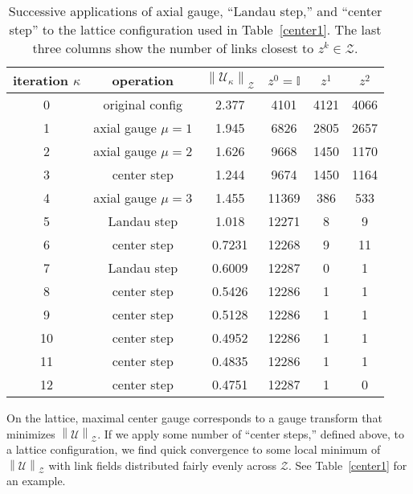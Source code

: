 \documentclass[preprint,aps,prd]{revtex4-2}
\newcommand{\zentrum}{\mathcal{Z}}       %
\newcommand{\config}{\mathcal{U}}
\begin{document}
\begin{table}
  \caption{Successive applications of axial gauge,
    ``Landau step,'' and ``center step'' to the lattice configuration
    used in Table~\ref{center1}.
    The last three columns show the number of links closest
    to $z^k \in \zentrum$.
    \label{center4}}
  \begin{tabular}{c|c|c|ccc}
    iteration $\kappa$ & operation & $\left\lVert \config_\kappa \right\rVert_\zentrum$
     & $z^0=\mathbb{I}$ & $z^1$ & $z^2$ \\
    \hline
    0 & original config    & 2.377  & 4101 & 4121 & 4066\\
    1 & axial gauge $\mu=1$& 1.945  & 6826 & 2805 & 2657\\
    2 & axial gauge $\mu=2$& 1.626  & 9668 & 1450 & 1170\\
    3 & center step        & 1.244  & 9674 & 1450 & 1164\\
    4 & axial gauge $\mu=3$& 1.455  & 11369 & 386 & 533\\
    5 & Landau step        & 1.018  & 12271 &   8 &   9\\
    6 & center step        & 0.7231 & 12268 &   9 &  11\\
    7 & Landau step        & 0.6009 & 12287 &   0 &   1\\
    8 & center step        & 0.5426 & 12286 &   1 &   1\\
    9 & center step        & 0.5128 & 12286 &   1 &   1\\
    10 & center step       & 0.4952 & 12286 &   1 &   1\\
    11 & center step       & 0.4835 & 12286 &   1 &   1\\
    12 & center step       & 0.4751 & 12287 &   1 &   0\\
  \end{tabular}
  \end{table}

On the lattice, maximal center gauge corresponds
to a gauge transform that minimizes
$\left\lVert \config \right\rVert_\zentrum$. 
If we apply some number of ``center steps,'' defined above,
to a lattice configuration, we find quick convergence to some local
minimum of $\left\lVert \config \right\rVert_\zentrum$ with
link fields distributed fairly evenly across $\zentrum$.
See Table~\ref{center1} for an example.
\end{document}
